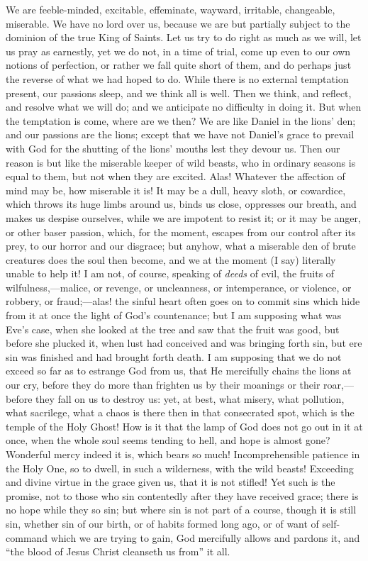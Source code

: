 We are feeble-minded, excitable, effeminate, wayward, irritable,
changeable, miserable. We have no lord over us, because we are but
partially subject to the dominion of the true King of Saints. Let us
try to do right as much as we will, let us pray as earnestly, yet we
do not, in a time of trial, come up even to our own notions of
perfection, or rather we fall quite short of them, and do perhaps just
the reverse of what we had hoped to do. While there is no external
temptation present, our passions sleep, and we think all is well. Then
we think, and reflect, and resolve what we will do; and we anticipate
no difficulty in doing it. But when the temptation is come, where are
we then? We are like Daniel in the lions' den; and our passions are
the lions; except that we have not Daniel's grace to prevail with God
for the shutting of the lions' mouths lest they devour us. Then our
reason is but like the miserable keeper of wild beasts, who in
ordinary seasons is equal to them, but not when they are excited.
Alas! Whatever the affection of mind may be, how miserable it is! It
may be a dull, heavy sloth, or cowardice, which throws its huge limbs
around us, binds us close, oppresses our breath, and makes us despise
ourselves, while we are impotent to resist it; or it may be anger, or
other baser passion, which, for the moment, escapes from our control
after its prey, to our horror and our disgrace; but anyhow, what a
miserable den of brute creatures does the soul then become, and we at
the moment (I say) literally unable to help it! I am not, of course,
speaking of \emph{deeds} of evil, the fruits of wilfulness,—malice,
or revenge, or uncleanness, or intemperance, or violence, or robbery,
or fraud;—alas! the sinful heart often goes on to commit sins which
hide from it at once the light of God's countenance; but I am
supposing what was Eve's case, when she looked at the tree and saw
that the fruit was good, but before she plucked it, when lust had
conceived and was bringing forth sin, but ere sin was finished and had
brought forth death. I am supposing that we do not exceed so far as to
estrange God from us, that He mercifully chains the lions at our cry,
before they do more than frighten us by their moanings or their roar,—before
they fall on us to destroy us: yet, at best, what misery, what
pollution, what sacrilege, what a chaos is there then in that
consecrated spot, which is the temple of the Holy Ghost! How is it
that the lamp of God does not go out in it at once, when the whole
soul seems tending to hell, and hope is almost gone? Wonderful mercy
indeed it is, which bears so much! Incomprehensible patience in the
Holy One, so to dwell, in such a wilderness, with the wild beasts!
Exceeding and divine virtue in the grace given us, that it is not
stifled! Yet such is the promise, not to those who sin contentedly
after they have received grace; there is no hope while they so sin;
but where sin is not part of a course, though it is still sin, whether
sin of our birth, or of habits formed long ago, or of want of
self-command which we are trying to gain, God mercifully allows and
pardons it, and ``the blood of Jesus Christ cleanseth us
from'' it all.

